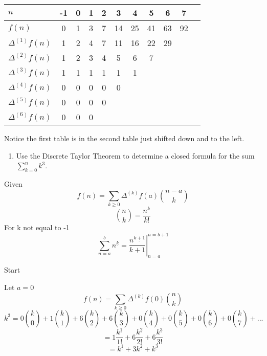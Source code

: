\documentclass[10pt, AMS Euler]{article}
\newcommand{\ds}{\displaystyle}
\begin{document}
            \begin{center}
                \begin{tabular}{l|cccccccccc}
                    {\bf $n$ } & -1 & 0 & 1 & 2 & 3 & 4 & 5 & 6 & 7 \\
                    \hline
                    {$f(n)$} & 0 & 1 & 3 & 7 & 14 & 25 & 41 & 63 & 92 \\
                    {$\Delta^{(1)} f(n)$} & 1 & 2 & 4 & 7 & 11 & 16 & 22 & 29 \\
                    {$\Delta^{(2)} f(n)$} & 1 & 2 & 3 & 4 & 5 & 6 & 7    \\
                    {$\Delta^{(3)} f(n)$} & 1 & 1 & 1 & 1 & 1 & 1    \\
                    {$\Delta^{(4)} f(n)$} & 0 & 0 & 0 & 0 & 0     \\
                    {$\Delta^{(5)} f(n)$} & 0 & 0 & 0 & 0     \\
                    {$\Delta^{(6)} f(n)$} & 0 & 0 & 0     \\
                \end{tabular}
            \end{center}


            Notice the first table is in the second table just shifted down and to the left.
            
        \newpage
		\begin{enumerate}[resume]
		\item Use the Discrete Taylor Theorem to determine a closed formula for the sum $\ds \sum_{k=0}^n k^3$. 
        \end{enumerate}
        
            Given
            $$f(n)=\sum_{k \geq 0}\Delta^{(k)}f(a)\ds\binom{n-a}{k}$$
            $$\ds\binom{n}{k} = \frac{n^{\underline{k}}}{k!}$$
            For k not equal to -1
            $$\ds\sum_{n=a}^b n^{\underline{k}} = \ds\left .\frac{n^{\underline{k+1}}}{k+1}\right|_{n=a}^{n=b+1}$$
            
            Start
            
            Let $a=0$
            $$f(n)=\sum_{k \geq 0}\Delta^{(k)}f(0)\ds\binom{n}{k}$$
            $$k^3=0\ds\binom{k}{0}+1\ds\binom{k}{1}+6\ds\binom{k}{2}+6\ds\binom{k}{3}+0\ds\binom{k}{4}+0\ds\binom{k}{5}+0\ds\binom{k}{6}+0\ds\binom{k}{7}+...$$
            $$=1\frac{k^{\underline{1}}}{1!}+6\frac{k^{\underline{2}}}{2!}+6\frac{k^{\underline{3}}}{3!}$$
            $$=k^{\underline{1}}+3k^{\underline{2}}+k^{\underline{3}}$$
    
\end{document}
